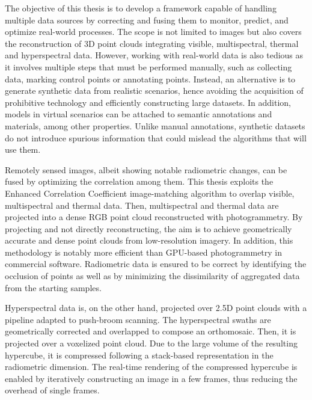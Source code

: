 
\normalsize
\libertineNormal

The objective of this thesis is to develop a framework capable of handling multiple data sources by correcting and fusing them to monitor, predict, and optimize real-world processes. The scope is not limited to images but also covers the reconstruction of 3D point clouds integrating visible, multispectral, thermal and hyperspectral data. However, working with real-world data is also tedious as it involves multiple steps that must be performed manually, such as collecting data, marking control points or annotating points. Instead, an alternative is to generate synthetic data from realistic scenarios, hence avoiding the acquisition of prohibitive technology and efficiently constructing large datasets. In addition, models in virtual scenarios can be attached to semantic annotations and materials, among other properties. Unlike manual annotations, synthetic datasets do not introduce spurious information that could mislead the algorithms that will use them.

Remotely sensed images, albeit showing notable radiometric changes, can be fused by optimizing the correlation among them. This thesis exploits the Enhanced Correlation Coefficient image-matching algorithm to overlap visible, multispectral and thermal data. Then, multispectral and thermal data are projected into a dense RGB point cloud reconstructed with photogrammetry. By projecting and not directly reconstructing, the aim is to achieve geometrically accurate and dense point clouds from low-resolution imagery. In addition, this methodology is notably more efficient than GPU-based photogrammetry in commercial software. Radiometric data is ensured to be correct by identifying the occlusion of points as well as by minimizing the dissimilarity of aggregated data from the starting samples. 

Hyperspectral data is, on the other hand, projected over 2.5D point clouds with a pipeline adapted to push-broom scanning. The hyperspectral swaths are geometrically corrected and overlapped to compose an orthomosaic. Then, it is projected over a voxelized point cloud. Due to the large volume of the resulting hypercube, it is compressed following a stack-based representation in the radiometric dimension. The real-time rendering of the compressed hypercube is enabled by iteratively constructing an image in a few frames, thus reducing the overhead of single frames. 

